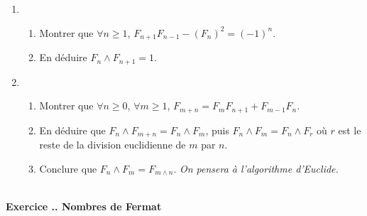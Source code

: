 \documentclass{article}
\newcounter{exo}
\newcommand{\exercice}[1][\null]{\textbf{\\ Exercice \thesection.\theexo. #1} \addtocounter{exo}{1}}
\begin{document}
\begin{enumerate}

\item \begin{enumerate}\item Montrer que $\forall n \ge 1$, $F_{n+1} F_{n-1} - (F_n)^2 = (-1)^n$.

\item En déduire $F_n \wedge F_{n+1} = 1$.

\end{enumerate}

\item \begin{enumerate}

\item Montrer que $\forall n \ge 0$, $\forall m \ge 1$, $F_{m+n} = F_m F_{n+1} + F_{m-1} F_n$.

\item En déduire que $F_n \wedge F_{m+n} = F_n \wedge F_m$, puis $F_n \wedge F_{m} = F_n \wedge F_r$ où $r$ est le reste de la division euclidienne de $m$ par $n$.

\item Conclure que $F_n \wedge F_{m} = F_{m \wedge n}$. \emph{On pensera à l'algorithme d'Euclide.}

\end{enumerate}

\end{enumerate}




\exercice[Nombres de Fermat]
\end{document}
